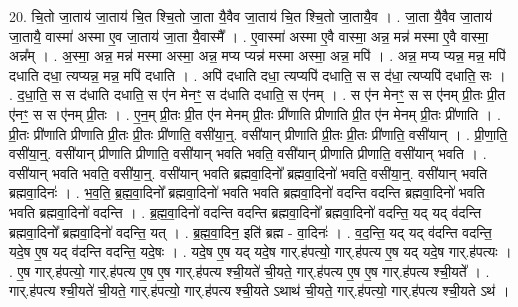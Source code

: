 \documentclass[17pt]{extarticle}
\begin{document}
20. चि॒तो जा॒ताय॑ जा॒ताय॑ चि॒त श्चि॒तो जा॒ता यै॒वैव जा॒ताय॑ चि॒त श्चि॒तो जा॒तायै॒व । . जा॒ता यै॒वैव जा॒ताय॑ जा॒तायै॒ वास्मा॑ अस्मा ए॒व जा॒ताय॑ जा॒ता यै॒वास्मै᳚ । . ए॒वास्मा॑ अस्मा ए॒वै वास्मा॒ अन्न॒ मन्न॑ मस्मा ए॒वै वास्मा॒ अन्न᳚म् । . अ॒स्मा॒ अन्न॒ मन्न॑ मस्मा अस्मा॒ अन्न॒ मप्य प्यन्न॑ मस्मा अस्मा॒ अन्न॒ मपि॑ । . अन्न॒ मप्य प्यन्न॒ मन्न॒ मपि॑ दधाति दधा॒ त्यप्यन्न॒ मन्न॒ मपि॑ दधाति । . अपि॑ दधाति दधा॒ त्यप्यपि॑ दधाति॒ स स द॑धा॒ त्यप्यपि॑ दधाति॒ सः । . द॒धा॒ति॒ स स द॑धाति दधाति॒ स ए॑न मेनꣳ॒॒ स द॑धाति दधाति॒ स ए॑नम् । . स ए॑न मेनꣳ॒॒ स स ए॑नम् प्री॒तः प्री॒त ए॑नꣳ॒॒ स स ए॑नम् प्री॒तः । . ए॒न॒म् प्री॒तः प्री॒त ए॑न मेनम् प्री॒तः प्री॑णाति प्रीणाति प्री॒त ए॑न मेनम् प्री॒तः प्री॑णाति । . प्री॒तः प्री॑णाति प्रीणाति प्री॒तः प्री॒तः प्री॑णाति॒ वसी॑या॒न्॒. वसी॑यान् प्रीणाति प्री॒तः प्री॒तः प्री॑णाति॒ वसी॑यान् । . प्री॒णा॒ति॒ वसी॑या॒न्॒. वसी॑यान् प्रीणाति प्रीणाति॒ वसी॑यान् भवति भवति॒ वसी॑यान् प्रीणाति प्रीणाति॒ वसी॑यान् भवति । . वसी॑यान् भवति भवति॒ वसी॑या॒न्॒. वसी॑यान् भवति ब्रह्मवा॒दिनो᳚ ब्रह्मवा॒दिनो॑ भवति॒ वसी॑या॒न्॒. वसी॑यान् भवति ब्रह्मवा॒दिनः॑ । . भ॒व॒ति॒ ब्र॒ह्म॒वा॒दिनो᳚ ब्रह्मवा॒दिनो॑ भवति भवति ब्रह्मवा॒दिनो॑ वदन्ति वदन्ति ब्रह्मवा॒दिनो॑ भवति भवति ब्रह्मवा॒दिनो॑ वदन्ति । . ब्र॒ह्म॒वा॒दिनो॑ वदन्ति वदन्ति ब्रह्मवा॒दिनो᳚ ब्रह्मवा॒दिनो॑ वदन्ति॒ यद् यद् व॑दन्ति ब्रह्मवा॒दिनो᳚ ब्रह्मवा॒दिनो॑ वदन्ति॒ यत् । . ब्र॒ह्म॒वा॒दिन॒ इति॑ ब्रह्म - वा॒दिनः॑ । . व॒द॒न्ति॒ यद् यद् व॑दन्ति वदन्ति॒ यदे॒ष ए॒ष यद् व॑दन्ति वदन्ति॒ यदे॒षः । . यदे॒ष ए॒ष यद् यदे॒ष गार्.ह॑पत्यो॒ गार्.ह॑पत्य ए॒ष यद् यदे॒ष गार्.ह॑पत्यः । . ए॒ष गार्.ह॑पत्यो॒ गार्.ह॑पत्य ए॒ष ए॒ष गार्.ह॑पत्य श्ची॒यते॑ ची॒यते॒ गार्.ह॑पत्य ए॒ष ए॒ष गार्.ह॑पत्य श्ची॒यते᳚ । . गार्.ह॑पत्य श्ची॒यते॑ ची॒यते॒ गार्.ह॑पत्यो॒ गार्.ह॑पत्य श्ची॒यते ऽथाथ॑ ची॒यते॒ गार्.ह॑पत्यो॒ गार्.ह॑पत्य श्ची॒यते ऽथ॑ । \newline
\end{document}
